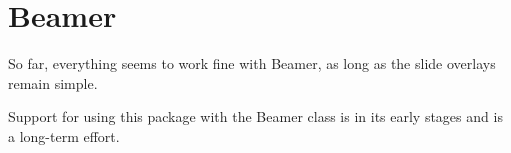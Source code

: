\documentclass[a4paper, 11pt]{article}
\begin{document}
%
%
%
%
%
%


\section{Beamer}

So far, everything seems to work fine with Beamer, as long as the slide overlays remain simple.

Support for using this package with the Beamer class is in its early stages and is a long-term effort.

%
\end{document}
